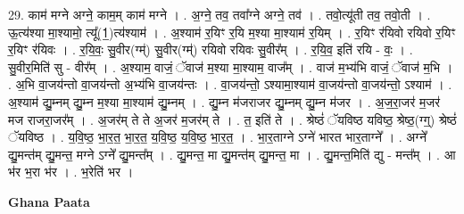 \documentclass[17pt]{extarticle}
\begin{document}
29. काम॑ मग्ने अग्ने॒ काम॒म् काम॑ मग्ने । . अ॒ग्ने॒ तव॒ तवा᳚ग्ने अग्ने॒ तव॑ । . तवो॒त्यू॑ती तव॒ तवो॒ती । . ऊ॒त्य॑श्या मा॒श्यामो॒ त्यू᳚(1॒)त्य॑श्याम॑ । . अ॒श्याम॑ र॒यिꣳ र॒यि म॒श्या मा॒श्याम॑ र॒यिम् । . र॒यिꣳ र॑यिवो रयिवो र॒यिꣳ र॒यिꣳ र॑यिवः । . र॒यि॒वः॒ सु॒वीर(ग्म्॑) सु॒वीर(ग्म्॑) रयिवो रयिवः सु॒वीर᳚म् । . र॒यि॒व॒ इति॑ रयि - वः॒ । . सु॒वीर॒मिति॑ सु - वीर᳚म् । . अ॒श्याम॒ वाजं॒ ॅवाज॑ म॒श्या मा॒श्याम॒ वाज᳚म् । . वाज॑ म॒भ्य॑भि वाजं॒ ॅवाज॑ म॒भि । . अ॒भि वा॒जय॑न्तो वा॒जय॑न्तो अ॒भ्य॑भि वा॒जय॑न्तः । . वा॒जय॑न्तो॒ ऽश्यामा॒श्याम॑ वा॒जय॑न्तो वा॒जय॑न्तो॒ ऽश्याम॑ । . अ॒श्याम॑ द्यु॒म्नम् द्यु॒म्न म॒श्या मा॒श्याम॑ द्यु॒म्नम् । . द्यु॒म्न म॑जराजर द्यु॒म्नम् द्यु॒म्न म॑जर । . अ॒ज॒रा॒जर॑ म॒जर॑ मज राजरा॒जर᳚म् । . अ॒जर॑म् ते ते अ॒जर॑ म॒जर॑म् ते । . त॒ इति॑ ते । . श्रेष्ठं॑ ॅयविष्ठ यविष्ठ॒ श्रेष्ठ॒(ग्ग्॒) श्रेष्ठं॑ ॅयविष्ठ । . य॒वि॒ष्ठ॒ भा॒र॒त॒ भा॒र॒त॒ य॒वि॒ष्ठ॒ य॒वि॒ष्ठ॒ भा॒र॒त॒ । . भा॒र॒ताग्ने ऽग्ने॑ भारत भार॒ताग्ने᳚ । . अग्ने᳚ द्यु॒मन्त॑म् द्यु॒मन्त॒ मग्ने ऽग्ने᳚ द्यु॒मन्त᳚म् । . द्यु॒मन्त॒ मा द्यु॒मन्त॑म् द्यु॒मन्त॒ मा । . द्यु॒मन्त॒मिति॑ द्यु - मन्त᳚म् । . आ भ॑र भ॒रा भ॑र । . भ॒रेति॑ भर । \newline

\textbf{Ghana Paata } \newline
\end{document}
